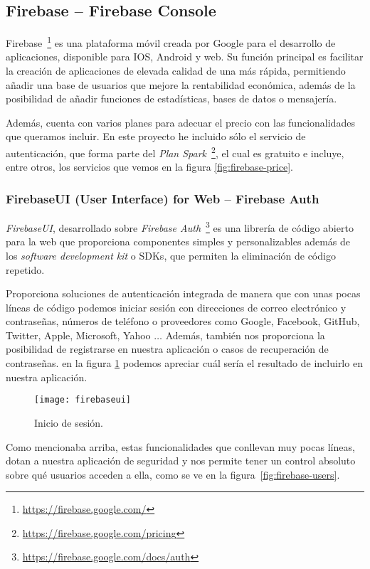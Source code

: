 \subsection{Firebase -- Firebase Console}
Firebase~\footnote{\url{https://firebase.google.com/}} es una plataforma móvil creada por Google para el desarrollo de aplicaciones, disponible para IOS, Android y web. Su función principal es facilitar la creación de aplicaciones de elevada calidad de una más rápida, permitiendo añadir una base de usuarios que mejore la rentabilidad económica, además de la posibilidad de añadir funciones de estadísticas, bases de datos o mensajería.


Además, cuenta con varios planes para adecuar el precio con las funcionalidades que queramos incluir. En este proyecto he incluido sólo el servicio de autenticación, que forma parte del \textit{Plan Spark}~\footnote{\url{https://firebase.google.com/pricing}}, el cual es gratuito e incluye, entre otros, los servicios que vemos en la figura \ref{fig:firebase-price}.



\subsubsection{FirebaseUI (User Interface) for Web -- Firebase Auth}
\textit{FirebaseUI}, desarrollado sobre \textit{Firebase Auth}~\footnote{\url{https://firebase.google.com/docs/auth}} es una librería de código abierto para la web que proporciona componentes simples y personalizables además de los \textit{software development kit} o SDKs, que permiten la eliminación de código repetido.


Proporciona soluciones de autenticación integrada de manera que con unas pocas líneas de código podemos iniciar sesión con direcciones de correo electrónico y contraseñas, números de teléfono o proveedores como Google, Facebook, GitHub, Twitter, Apple, Microsoft, Yahoo $\dots$ Además, también nos proporciona la posibilidad de registrarse en nuestra aplicación o casos de recuperación de contraseñas. en la figura \ref{fig:firebaseui} podemos apreciar cuál sería el resultado de incluirlo en nuestra aplicación.
\begin{figure}[!h]
	\centering
	\texttt{[image: firebaseui]}
	\caption{Inicio de sesión.}\label{fig:firebaseui}
\end{figure}
\FloatBarrier

Como mencionaba arriba, estas funcionalidades que conllevan muy pocas líneas, dotan a nuestra aplicación de seguridad y nos permite tener un control absoluto sobre qué usuarios acceden a ella, como se ve en la figura~\ref{fig:firebase-users}.



